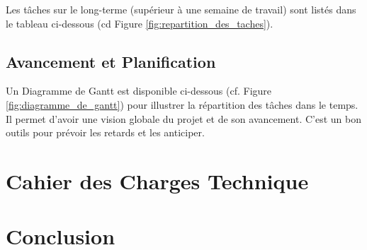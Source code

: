 \documentclass[11pt]{article}
\begin{document}
Les tâches sur le long-terme (supérieur à une semaine de travail) sont listés dans le tableau ci-dessous (cd Figure \ref*{fig:repartition_des_taches}).



\subsection{Avancement et Planification}

Un Diagramme de Gantt est disponible ci-dessous (cf. Figure \ref{fig:diagramme_de_gantt}) pour illustrer la répartition des tâches dans le temps.
Il permet d'avoir une vision globale du projet et de son avancement. C'est un bon outils pour prévoir les retards et les anticiper.




\newpage
\section{Cahier des Charges Technique}


\newpage
\section{Conclusion}
\end{document}
